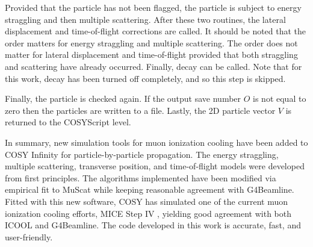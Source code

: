 Provided that the particle has not been flagged, the particle is subject to energy straggling and then multiple scattering. After these two routines, the lateral displacement and time-of-flight corrections are called. It should be noted that the order matters for energy straggling and multiple scattering. The order does not matter for lateral displacement and time-of-flight provided that both straggling and scattering have already occurred. Finally, decay can be called. Note that for this work, decay has been turned off completely, and so this step is skipped.

Finally, the particle is checked again. If the output save number $O$ is not equal to zero then the particles are written to a file. Lastly, the 2D particle vector $V$ is returned to the COSYScript level.

\label{sec:summary}

In summary, new simulation tools for muon ionization cooling have been added to COSY Infinity for particle-by-particle propagation. The energy straggling, multiple scattering, transverse position, and time-of-flight models were developed from first principles. The algorithms implemented have been modified via empirical fit to MuScat \cite{muscat} while keeping reasonable agreement with G4Beamline. Fitted with this new software, COSY has simulated one of the current muon ionization cooling efforts, MICE Step IV \cite{mice}, yielding good agreement with both ICOOL and G4Beamline. The code developed in this work is accurate, fast, and user-friendly.